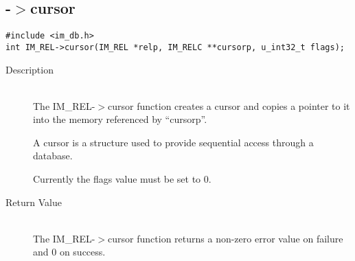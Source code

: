\newpage
\subsection{{\IMREL}-$>$cursor}
\begin{verbatim}
#include <im_db.h>
int IM_REL->cursor(IM_REL *relp, IM_RELC **cursorp, u_int32_t flags);
\end{verbatim}
\begin{description}
\item[Description]\ \\

  The IM\_REL-$>$cursor function creates a cursor and copies a pointer
  to it into the memory referenced by ``cursorp''.

  A cursor is a structure used to provide sequential access through a
  database.
  
  Currently the flags value must be set to 0.

\item[Return Value]\ \\
  The IM\_REL-$>$cursor function returns a non-zero error value on
  failure and 0 on success.
\end{description}

\newpage
